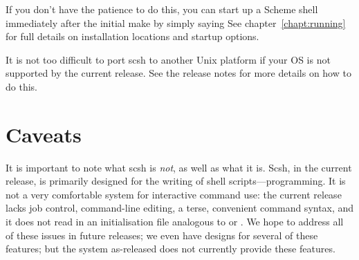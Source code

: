 If you don't have the patience to do this, you can start up
a Scheme shell immediately after the initial make by simply
saying
See chapter~\ref{chapt:running} for full details on installation
locations and startup options.

It is not too difficult to port scsh to another Unix platform if your
OS is not supported by the current release.
See the release notes for more details on how to do this.

\section{Caveats}

It is important to note what scsh is \emph{not}, as well as what it is.
Scsh, in the current release, is primarily designed for the writing of
shell scripts---programming.
It is not a very comfortable system for interactive command use: 
the current release lacks job control, command-line editing, a terse,
convenient command syntax, and it does not read in an initialisation
file analogous to  or .
We hope to address all of these issues in future releases;
we even have designs for several of these features;
but the system as-released does not currently provide these features.

